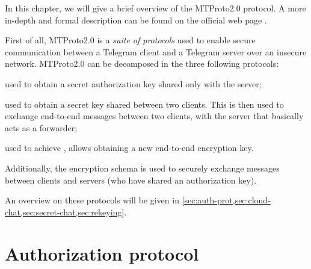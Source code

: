 \label{sec:mtproto2-informal}

In this chapter, we will give a brief overview of the MTProto2.0 protocol. A more in-depth and formal description can be found on the official web page \cite{Telegram-MTProto2.0}.

First of all, MTProto2.0 is a \textit{suite of protocols} used to enable secure communication between a Telegram client and a Telegram server over an insecure network. MTProto2.0 can be decomposed in the three following protocols:

\begin{description}[style=nextline]
  \item[Authorization] used to obtain a secret authorization key shared only with the server;
  \item[\Schat{}] used to obtain a secret key shared between two clients. This is then used to exchange end-to-end messages between two clients, with the server that basically acts as a forwarder;
  \item[Rekeying] used to achieve \pfs{}, allows obtaining a new end-to-end encryption key.
\end{description}

Additionally, the \cchats{} encryption schema is used to securely exchange messages between clients and servers (who have shared an authorization key).

An overview on these protocols will be given in \cref{sec:auth-prot,sec:cloud-chat,sec:secret-chat,sec:rekeying}.

\section{Authorization protocol}
\label{sec:auth-prot}

